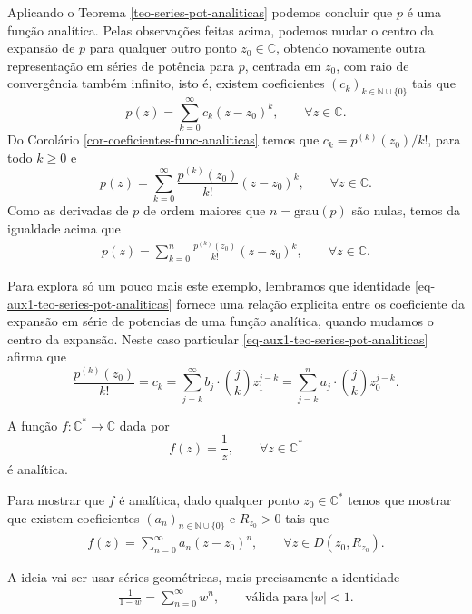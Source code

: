 Aplicando o Teorema \ref{teo-series-pot-analiticas} podemos
concluir que $p$ é uma função analítica. 
Pelas observações feitas acima, podemos mudar o centro da expansão de $p$
para qualquer outro ponto $z_0\in\mathbb{C}$, obtendo novamente outra 
representação em séries de potência para $p$, centrada em $z_0$, com raio 
de convergência também infinito, isto é, existem coeficientes $(c_k)_{k\in\mathbb{N}\cup\{0\}}$ tais que  
\[
p(z) = \sum_{k=0}^{\infty} c_k(z-z_0)^k, \qquad \forall z\in\mathbb{C}.
\]
Do Corolário \ref{cor-coeficientes-func-analiticas} temos que
$c_k= p^{(k)}(z_0)/k!$, para todo $k\geqslant 0$ e
\[
p(z) = \sum_{k=0}^{\infty} \frac{p^{(k)}(z_0)}{k!}(z-z_0)^k, \qquad \forall z\in\mathbb{C}.
\] 
Como as derivadas de $p$ de ordem maiores que $n=\mathrm{grau}(p)$ são nulas, 
temos da igualdade acima que 
\begin{align}\label{eq-polinomio-como-serie-centro-z0}
p(z) = \sum_{k=0}^{n} \frac{p^{(k)}(z_0)}{k!}(z-z_0)^k, \qquad \forall z\in\mathbb{C}.
\end{align}

Para explora só um pouco mais este exemplo, lembramos que identidade 
\eqref{eq-aux1-teo-series-pot-analiticas} fornece uma relação explicita
entre os coeficiente da expansão em série de potencias de uma função 
analítica, quando mudamos o centro da expansão.
Neste caso particular \eqref{eq-aux1-teo-series-pot-analiticas} afirma que
\[
\frac{p^{(k)}(z_0)}{k!}
=
c_k 
= 
\sum_{j=k}^{\infty}  b_j\cdot \binom{j}{k}z_1^{j-k}
=
\sum_{j=k}^{n}  a_j\cdot \binom{j}{k}z_0^{j-k}.
\]

\begin{exemplo}\label{exe-1/z-analitica}
A função $f:\mathbb{C}^{*}\to\mathbb{C}$ dada por 
\[
f(z) = \frac{1}{z}, \qquad \forall z\in\mathbb{C}^{*}
\]
é analítica. 
\end{exemplo}

Para mostrar que $f$ é analítica, 
dado qualquer ponto $z_0\in\mathbb{C}^{*}$ temos que mostrar que
existem coeficientes $(a_n)_{n\in\mathbb{N}\cup\{0\}}$ e 
$R_{z_0}>0$ tais que 
\begin{align}\label{eq-aux3-analiticidade-1/z}
f(z) = \sum_{n=0}^{\infty} a_n(z-z_0)^n, \qquad \forall z\in D(z_0,R_{z_0}).
\end{align}

A ideia vai ser usar séries geométricas, mais precisamente a 
identidade
\begin{align}\label{eq-aux1-analiticidade-1/z}
\frac{1}{1-w} = \sum_{n=0}^{\infty} w^n, \qquad \text{válida para} \ |w|<1.
\end{align}

